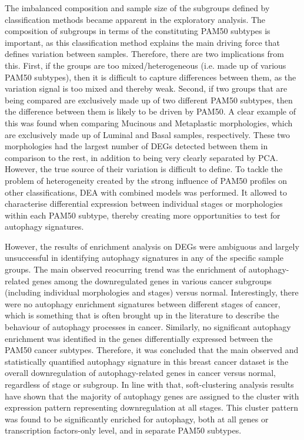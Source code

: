 The imbalanced composition and sample size of the subgroups defined by classification methods became apparent in the exploratory analysis. The composition of subgroups in terms of the constituting PAM50 subtypes is important, as this classification method explains the main driving force that defines variation between samples. Therefore, there are two implications from this. First, if the groups are too mixed/heterogeneous (i.e. made up of various PAM50 subtypes), then it is difficult to capture differences between them, as the variation signal is too mixed and thereby weak. Second, if two groups that are being compared are exclusively made up of two different PAM50 subtypes, then the difference between them is likely to be driven by PAM50. A clear example of this was found when comparing Mucinous and Metaplastic morphologies, which are exclusively made up of Luminal and Basal samples, respectively. These two morphologies had the largest number of DEGs detected between them in comparison to the rest, in addition to being very clearly separated by PCA. However,  the true source of their variation is difficult to define. 
To tackle the problem of heterogeneity created by the strong influence of PAM50 profiles on other classifications, DEA with combined models was performed. It allowed to characterise differential expression between individual stages or morphologies within each PAM50 subtype, thereby creating more opportunities to test for autophagy signatures.

However, the results of enrichment analysis on DEGs were ambiguous and largely unsuccessful in identifying autophagy signatures in any of the specific sample groups. The main observed reocurring trend was the enrichment of autophagy-related genes among the downregulated genes in various cancer subgroups (including individual morphologies and stages) versus normal. Interestingly, there were no autophagy enrichment signatures between different stages of cancer, which is something that is often brought up in the literature to describe the behaviour of autophagy processes in cancer. Similarly, no significant autophagy enrichment was identified in the genes differentially expressed between the PAM50 cancer subtypes. Therefore, it was concluded that the main observed and statistically quantified autophagy signature in this breast cancer dataset is the overall downregulation of autophagy-related genes in cancer versus normal, regardless of stage or subgroup.
In line with that, soft-clustering analysis results have shown that the majority of autophagy genes are assigned to the cluster with expression pattern representing downregulation at all stages. This cluster pattern was found to be significantly enriched for autophagy, both at all genes or transcription factors-only level, and in separate PAM50 subtypes. 

